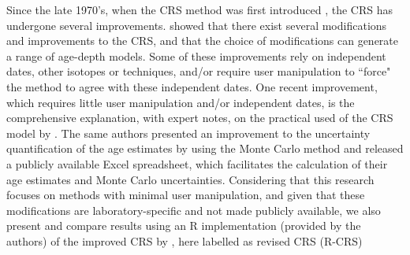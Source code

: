 \documentclass [10pt] {article}
\begin{document}
Since the late 1970's, when the CRS method was first introduced \citep{Appleby1978,Robbins1978}, the CRS has undergone several improvements.
\citet{Barsanti2020} showed that there exist several modifications and improvements to the CRS, and that the choice of modifications can generate a range of age-depth models.
Some of these improvements rely on independent dates, other isotopes or techniques, and/or require user manipulation to ``force" the method to agree with these independent dates.
One recent improvement, which requires little user manipulation and/or independent dates, is the comprehensive explanation, with expert notes, on the practical used of the CRS model by \citet{Sanchez-Cabeza2012}. 
The same authors presented an improvement to the uncertainty quantification of the age estimates by using the Monte Carlo method \citep{Sanchez-Cabeza2014} and released a publicly available Excel spreadsheet, which facilitates the calculation of their age estimates and Monte Carlo uncertainties. 
Considering that this research focuses on methods with minimal user manipulation, and given that these modifications are laboratory-specific and not made publicly available, we also present and compare results using an R implementation (provided by the authors) of the improved CRS by \citet{Sanchez-Cabeza2014}, here labelled as revised CRS (R-CRS)


\end{document}
